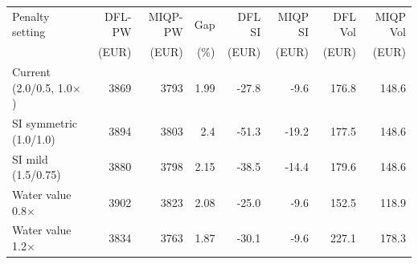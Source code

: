 \begin{tabular}{lrrrrrrr}
\toprule
Penalty setting & DFL-PW & MIQP-PW & Gap & DFL SI & MIQP SI & DFL Vol & MIQP Vol \\
 & (EUR) & (EUR) & (\%) & (EUR) & (EUR) & (EUR) & (EUR) \\
\midrule
Current (2.0/0.5, 1.0$\times$) & 3869 & 3793 & 1.99 & -27.8 & -9.6 & 176.8 & 148.6 \\
SI symmetric (1.0/1.0) & 3894 & 3803 & 2.4 & -51.3 & -19.2 & 177.5 & 148.6 \\
SI mild (1.5/0.75) & 3880 & 3798 & 2.15 & -38.5 & -14.4 & 179.6 & 148.6 \\
Water value 0.8$\times$ & 3902 & 3823 & 2.08 & -25.0 & -9.6 & 152.5 & 118.9 \\
Water value 1.2$\times$ & 3834 & 3763 & 1.87 & -30.1 & -9.6 & 227.1 & 178.3 \\
\bottomrule
\end{tabular}
